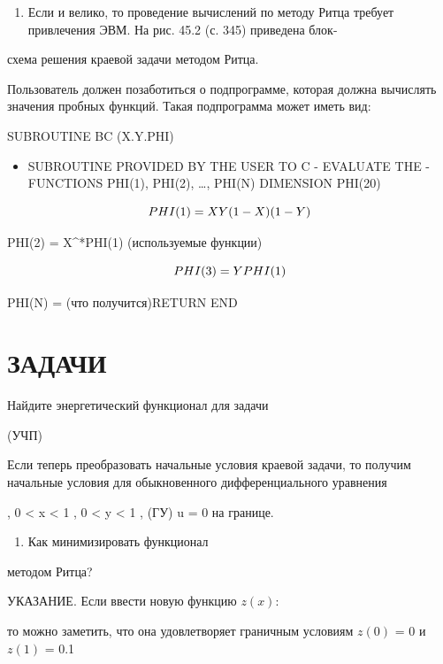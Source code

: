 \documentclass[
  ukrainian,
]{article}
\providecommand{\tightlist}{%
  \setlength{\itemsep}{0pt}\setlength{\parskip}{0pt}}
\begin{document}
\begin{enumerate}
\def\labelenumi{\arabic{enumi}.}
\setcounter{enumi}{4}
\tightlist
\item
  Если и велико, то проведение вычислений по методу Ритца требует
  привлечения ЭВМ. На рис. 45.2 (с. 345) приведена блок-
\end{enumerate}

схема решения краевой задачи методом Ритца.

Пользователь должен позаботиться о подпрограмме, которая должна
вычислять значения пробных функций. Такая подпрограмма может иметь вид:

SUBROUTINE BC (X.Y.PHI)

\begin{itemize}
\tightlist
\item
  SUBROUTINE PROVIDED BY THE USER TO C - EVALUATE THE - FUNCTIONS
  PHI(1), PHI(2), \ldots, PHI(N) DIMENSION PHI(20)
\end{itemize}

\[
PHI(1) = X\*Y\*(1-X)\*(1-Y)
\]

PHI(2) = X\^{}*PHI(1) (используемые функции)

\[
PHI(3) = Y\*PHI(1)
\]

PHI(N) = (что получится)RETURN END

\section{\texorpdfstring{\textbf{ЗА}ДАЧИ}{ЗАДАЧИ}}\label{ux437ux430ux434ux430ux447ux438-1}

Найдите энергетический функционал для задачи

(УЧП)

Если теперь преобразовать начальные условия краевой задачи, то получим
начальные условия для обыкновенного дифференциального уравнения

, 0 \textless{} x \textless{} 1 , 0 \textless{} y \textless{} 1 , (ГУ) u
= 0 на границе.

\begin{enumerate}
\def\labelenumi{\arabic{enumi}.}
\setcounter{enumi}{1}
\tightlist
\item
  Как минимизировать функционал
\end{enumerate}

методом Ритца?

УКАЗАНИЕ. Если ввести новую функцию \(z(x)\):

то можно заметить, что она удовлетворяет граничным условиям \(z(0)\) = 0
и \(z(1)\) = 0.1
\end{document}

